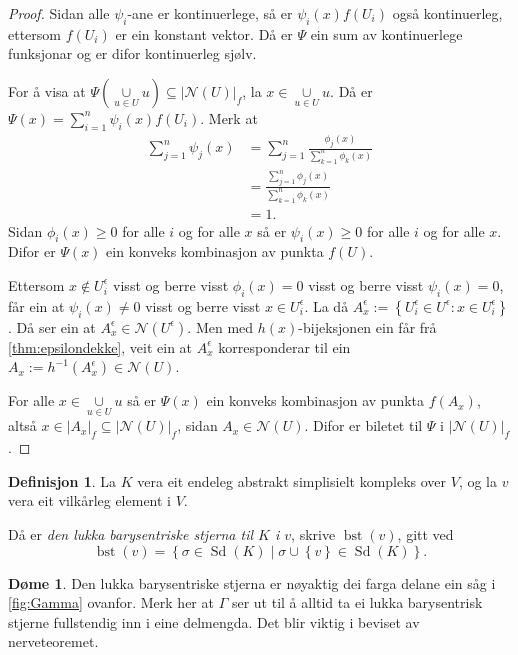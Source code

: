 \documentclass[a4paper, 12pt, norsk]{article}
\theoremstyle{plain}
\theoremstyle{definition}
\newtheorem{definition}[theorem]{Definisjon}
\newtheorem{example}[theorem]{Døme}
\newcommand{\Nc}{\mathcal{N}}
\newcommand{\union}{ \mathop{\cup}\limits }
\newcommand{\gr}[1]{ \lvert #1 \rvert } %
\newcommand{\set}[1]{ \left\{ #1 \right\} } %
\newcommand{\tuple}[1]{ \left( #1 \right) } %
\DeclareMathOperator{\Sd}{Sd} %
\DeclareMathOperator{\bst}{bst} %
\begin{document}
\begin{proof}
	Sidan alle \( \psi_i \)-ane er kontinuerlege, så er \( \psi_i(x) f(U_i) \) også kontinuerleg, ettersom \( f(U_i) \) er ein konstant vektor. Då er \( \Psi \) ein sum av kontinuerlege funksjonar og er difor kontinuerleg sjølv.

	For å visa at \( \Psi\tuple{\union_{u \in U} u} \subseteq \gr{\Nc(U)}_f \), la \( x \in \union_{u \in U} u \). Då er \( \Psi(x) = \sum_{i=1}^n \psi_i(x)f(U_i) \). Merk at
	\begin{align*}
		\sum_{j=1}^n \psi_j(x)  &= \sum_{j=1}^n \frac{\phi_j(x)}{\sum_{k=1}^n \phi_k(x)} \\
		&= \frac{\sum_{j=1}^n \phi_j(x)}{\sum_{k=1}^n \phi_k(x)} \\
		&= 1.
	\end{align*}
	Sidan \( \phi_i(x) \geq 0 \) for alle \( i \) og for alle \( x \) så er \( \psi_i(x) \geq 0 \) for alle \( i \) og for alle \( x \). Difor er \( \Psi(x) \) ein konveks kombinasjon av punkta \( f(U) \).

	Ettersom \( x \not\in U_i^\epsilon \) visst og berre visst \( \phi_i(x) = 0 \) visst og berre visst \( \psi_i(x) = 0 \), får ein at \( \psi_i(x) \neq 0 \) visst og berre visst \( x \in U_i^\epsilon \). La då \( A_x^\epsilon := \set{U_i^\epsilon \in U^\epsilon : x \in U_i^\epsilon} \). Då ser ein at \( A_x^\epsilon \in \Nc(U^\epsilon) \). Men med \( h(x) \)-bijeksjonen ein får frå \autoref{thm:epsilondekke}, veit ein at \( A_x^\epsilon \) korresponderar til ein \( A_x := h^{-1}(A_x^\epsilon) \in \Nc(U) \).
	
	For alle \( x \in \union_{u \in U} u \) så er \( \Psi(x) \) ein konveks kombinasjon av punkta \( f(A_x) \), altså \( x \in \gr{A_x}_f \subseteq \gr{\Nc(U)}_f \), sidan \( A_x \in \Nc(U) \). Difor er biletet til \( \Psi \) i \( \gr{\Nc(U)}_f \).
\end{proof}

\begin{definition} \label{def:bst}
	La \( K \) vera eit endeleg abstrakt simplisielt kompleks over \( V \), og la \( v \) vera eit vilkårleg element i \( V \).
	
	Då er \emph{den lukka barysentriske stjerna til \( K \) i \( v \)}, skrive \( \bst(v) \), gitt ved
	\[
		\bst(v) = \set{\sigma \in \Sd(K) \mid \sigma \union \set{v} \in \Sd(K)}.
	\]
\end{definition}

\begin{example}
	Den lukka barysentriske stjerna er nøyaktig dei farga delane ein såg i \autoref{fig:Gamma} ovanfor. Merk her at \( \Gamma \) ser ut til å alltid ta ei lukka barysentrisk stjerne fullstendig inn i eine delmengda. Det blir viktig i beviset av nerveteoremet.
\end{example}
\end{document}
